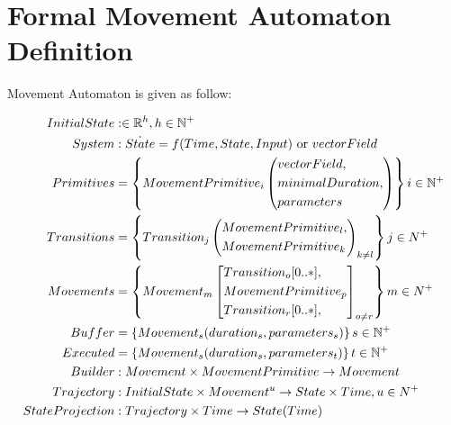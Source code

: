 \section{Formal Movement Automaton Definition}\label{s:MovementAutomatonDefinitionAndProperties}

    \begin{definition}\label{def:movementAutomaton}Movement Automaton is given as follow:
    
    \begin{align}   
        \label{eq:madInitialState}
        InitialState&: \in \mathbb{R}^h, h\in \mathbb{N}^+\\
        \label{eq:madSystemdefinition}
        System&: \dot{State}=f(Time,State,Input)\text{ or } vectorField\\
        \label{eq:madMovementPrimitive}
        Primitives &= \left\{MovementPrimitive_i\left(
                                \begin{aligned}
                                &vectorField,\\
                                &minimalDuration,\\
                                &parameters
                                \end{aligned}\right)
                            \right\} i \in \mathbb{N}^+\\
        \label{eq:madTransitions}
        Transitions&= \left\{Transition_j\left(
                                \begin{aligned}
                                    &MovementPrimitive_l,\\
                                    &MovementPrimitive_k
                                \end{aligned}\right)_{k\neq l}\right\} j\in N^+\\
        \label{eq:madMovements}
        Movements&= \left\{Movement_m\left[
                                \begin{aligned}
                                    &Transition_o[0..*],\\
                                    &MovementPrimitive_p\\
                                    &Transition_r[0..*],\\
                                \end{aligned}\right]_{o \neq r}\right\}  m\in N^+\\
        \label{eq:madBuffer}
        Buffer&= \left\{Movement_s(duration_s,parameters_s)\right\} s\in \mathbb{N}^+\\
        \label{eq:madExecuted}
        Executed&= \left\{Movement_s(duration_s,parameters_t)\right\} t\in \mathbb{N}^+\\
        \label{eq:madBuilder}
        Builder&:Movement \times MovementPrimitive \to Movement\\
        \label{eq:madTrajectory}
        Trajectory&:InitialState\times Movement^u \to State \times Time, u\in N^+\\
        \label{eq:madStateProjection}
        StateProjection&:Trajectory\times Time \to State(Time)  
    \end{align}
    

\end{definition}
